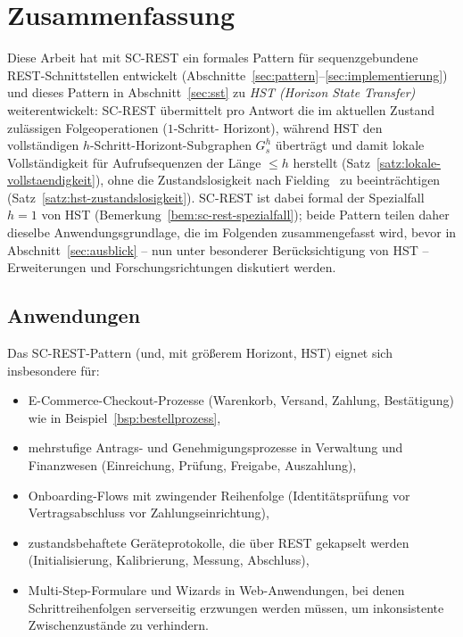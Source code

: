 ﻿\documentclass[a4paper,12pt]{article}
\theoremstyle{definition}
\begin{document}
\section{Zusammenfassung}

Diese Arbeit hat mit SC-REST ein formales Pattern für sequenzgebundene REST-Schnittstellen
entwickelt (Abschnitte~\ref{sec:pattern}--\ref{sec:implementierung}) und dieses Pattern in
Abschnitt~\ref{sec:sst} zu \emph{HST (Horizon State Transfer)} weiterentwickelt: SC-REST
übermittelt pro Antwort die im aktuellen Zustand zulässigen Folgeoperationen ($1$-Schritt-
Horizont), während HST den vollständigen $h$-Schritt-Horizont-Subgraphen $G_s^h$
überträgt und damit lokale Vollständigkeit für Aufrufsequenzen der Länge $\le h$
herstellt (Satz~\ref{satz:lokale-vollstaendigkeit}), ohne die Zustandslosigkeit nach
Fielding~\cite{fielding2000} zu beeinträchtigen (Satz~\ref{satz:hst-zustandslosigkeit}).
SC-REST ist dabei formal der Spezialfall $h=1$ von HST
(Bemerkung~\ref{bem:sc-rest-spezialfall}); beide Pattern teilen daher dieselbe
Anwendungsgrundlage, die im Folgenden zusammengefasst wird, bevor in
Abschnitt~\ref{sec:ausblick} -- nun unter besonderer Berücksichtigung von HST --
Erweiterungen und Forschungsrichtungen diskutiert werden.

\subsection{Anwendungen}

Das SC-REST-Pattern (und, mit größerem Horizont, HST) eignet sich insbesondere für:
\begin{itemize}
	\item E-Commerce-Checkout-Prozesse (Warenkorb, Versand, Zahlung, Bestätigung) wie in
	      Beispiel~\ref{bsp:bestellprozess},
	\item mehrstufige Antrags- und Genehmigungsprozesse in Verwaltung und Finanzwesen
	      (Einreichung, Prüfung, Freigabe, Auszahlung),
	\item Onboarding-Flows mit zwingender Reihenfolge (Identitätsprüfung vor
	      Vertragsabschluss vor Zahlungseinrichtung),
	\item zustandsbehaftete Geräteprotokolle, die über REST gekapselt werden
	      (Initialisierung, Kalibrierung, Messung, Abschluss),
	\item Multi-Step-Formulare und Wizards in Web-Anwendungen, bei denen
	      Schrittreihenfolgen serverseitig erzwungen werden müssen, um inkonsistente
	      Zwischenzustände zu verhindern.
\end{itemize}
\end{document}
